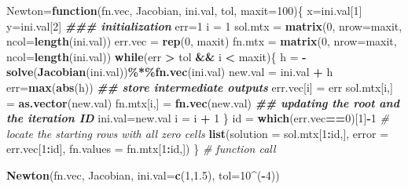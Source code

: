 \documentclass[
]{book}
\newenvironment{Shaded}{\begin{snugshade}}{\end{snugshade}}
\newcommand{\AttributeTok}[1]{\textcolor[rgb]{0.13,0.29,0.53}{#1}}
\newcommand{\CommentTok}[1]{\textcolor[rgb]{0.56,0.35,0.01}{\textit{#1}}}
\newcommand{\ControlFlowTok}[1]{\textcolor[rgb]{0.13,0.29,0.53}{\textbf{#1}}}
\newcommand{\DecValTok}[1]{\textcolor[rgb]{0.00,0.00,0.81}{#1}}
\newcommand{\DocumentationTok}[1]{\textcolor[rgb]{0.56,0.35,0.01}{\textbf{\textit{#1}}}}
\newcommand{\FloatTok}[1]{\textcolor[rgb]{0.00,0.00,0.81}{#1}}
\newcommand{\FunctionTok}[1]{\textcolor[rgb]{0.13,0.29,0.53}{\textbf{#1}}}
\newcommand{\NormalTok}[1]{#1}
\newcommand{\OtherTok}[1]{\textcolor[rgb]{0.56,0.35,0.01}{#1}}
\newcommand{\SpecialCharTok}[1]{\textcolor[rgb]{0.81,0.36,0.00}{\textbf{#1}}}
\begin{document}
\begin{Shaded}
\begin{Highlighting}[]
\NormalTok{Newton}\OtherTok{=}\ControlFlowTok{function}\NormalTok{(fn.vec, Jacobian, ini.val, tol, }\AttributeTok{maxit=}\DecValTok{100}\NormalTok{)\{}
\NormalTok{ x}\OtherTok{=}\NormalTok{ini.val[}\DecValTok{1}\NormalTok{]}
\NormalTok{ y}\OtherTok{=}\NormalTok{ini.val[}\DecValTok{2}\NormalTok{]}
 \DocumentationTok{\#\#\# initialization}
\NormalTok{ err}\OtherTok{=}\DecValTok{1}
\NormalTok{ i }\OtherTok{=} \DecValTok{1}
\NormalTok{ sol.mtx }\OtherTok{=} \FunctionTok{matrix}\NormalTok{(}\DecValTok{0}\NormalTok{, }\AttributeTok{nrow=}\NormalTok{maxit, }\AttributeTok{ncol=}\FunctionTok{length}\NormalTok{(ini.val))}
\NormalTok{ err.vec }\OtherTok{=} \FunctionTok{rep}\NormalTok{(}\DecValTok{0}\NormalTok{, maxit)}
\NormalTok{ fn.mtx }\OtherTok{=} \FunctionTok{matrix}\NormalTok{(}\DecValTok{0}\NormalTok{, }\AttributeTok{nrow=}\NormalTok{maxit, }\AttributeTok{ncol=}\FunctionTok{length}\NormalTok{(ini.val))}
 \ControlFlowTok{while}\NormalTok{(err }\SpecialCharTok{\textgreater{}}\NormalTok{ tol  }\SpecialCharTok{\&\&}\NormalTok{ i }\SpecialCharTok{\textless{}}\NormalTok{ maxit)\{}
\NormalTok{   h }\OtherTok{=} \SpecialCharTok{{-}} \FunctionTok{solve}\NormalTok{(}\FunctionTok{Jacobian}\NormalTok{(ini.val))}\SpecialCharTok{\%*\%}\FunctionTok{fn.vec}\NormalTok{(ini.val)}
\NormalTok{   new.val }\OtherTok{=}\NormalTok{ ini.val }\SpecialCharTok{+}\NormalTok{ h }
\NormalTok{   err}\OtherTok{=}\FunctionTok{max}\NormalTok{(}\FunctionTok{abs}\NormalTok{(h))}
   \DocumentationTok{\#\# store intermediate outputs}
\NormalTok{   err.vec[i] }\OtherTok{=}\NormalTok{ err}
\NormalTok{   sol.mtx[i,] }\OtherTok{=} \FunctionTok{as.vector}\NormalTok{(new.val)}
\NormalTok{   fn.mtx[i,] }\OtherTok{=} \FunctionTok{fn.vec}\NormalTok{(new.val)}
   \DocumentationTok{\#\# updating the root and the iteration ID}
\NormalTok{   ini.val}\OtherTok{=}\NormalTok{new.val}
\NormalTok{   i }\OtherTok{=}\NormalTok{ i }\SpecialCharTok{+} \DecValTok{1}
\NormalTok{ \}}
\NormalTok{ id }\OtherTok{=} \FunctionTok{which}\NormalTok{(err.vec}\SpecialCharTok{==}\DecValTok{0}\NormalTok{)[}\DecValTok{1}\NormalTok{]}\SpecialCharTok{{-}}\DecValTok{1}   \CommentTok{\# locate the starting rows with all zero cells}
 \FunctionTok{list}\NormalTok{(}\AttributeTok{solution =}\NormalTok{ sol.mtx[}\DecValTok{1}\SpecialCharTok{:}\NormalTok{id,], }\AttributeTok{error =}\NormalTok{ err.vec[}\DecValTok{1}\SpecialCharTok{:}\NormalTok{id], }\AttributeTok{fn.values =}\NormalTok{ fn.mtx[}\DecValTok{1}\SpecialCharTok{:}\NormalTok{id,])}
\NormalTok{\}}
\CommentTok{\# function call}

\FunctionTok{Newton}\NormalTok{(fn.vec, Jacobian, }\AttributeTok{ini.val=}\FunctionTok{c}\NormalTok{(}\DecValTok{1}\NormalTok{,}\FloatTok{1.5}\NormalTok{), }\AttributeTok{tol=}\DecValTok{10}\SpecialCharTok{\^{}}\NormalTok{(}\SpecialCharTok{{-}}\DecValTok{4}\NormalTok{))}
\end{Highlighting}
\end{Shaded}
\end{document}
